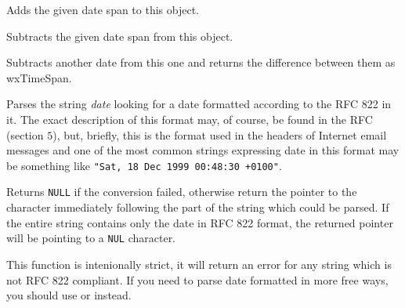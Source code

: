 

Adds the given date span to this object.


\label{wxdatetimesubtractds}




Subtracts the given date span from this object.


\label{wxdatetimesubtractdt}


Subtracts another date from this one and returns the difference between them
as wxTimeSpan.


\label{wxdatetimeparserfc822date}


Parses the string {\it date} looking for a date formatted according to the RFC
822 in it. The exact description of this format may, of course, be found in
the RFC (section $5$), but, briefly, this is the format used in the headers of
Internet email messages and one of the most common strings expressing date in
this format may be something like {\tt "Sat, 18 Dec 1999 00:48:30 +0100"}.

Returns {\tt NULL} if the conversion failed, otherwise return the pointer to
the character immediately following the part of the string which could be
parsed. If the entire string contains only the date in RFC 822 format,
the returned pointer will be pointing to a {\tt NUL} character.

This function is intenionally strict, it will return an error for any string
which is not RFC 822 compliant. If you need to parse date formatted in more
free ways, you should use  or
 instead.

